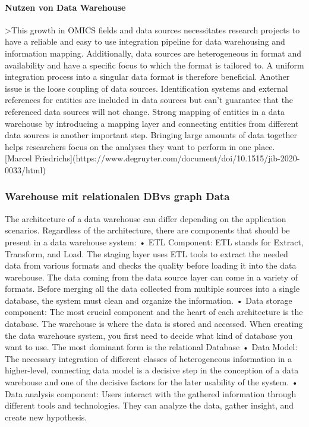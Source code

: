 \paragraph{Nutzen von Data Warehouse}
>This growth in OMICS fields and data sources necessitates research projects to have a reliable and easy to use integration pipeline for data warehousing and information mapping. Additionally, data sources are heterogeneous in format and availability and have a specific focus to which the format is tailored to. A uniform integration process into a singular data format is therefore beneficial. Another issue is the loose coupling of data sources. Identification systems and external references for entities are included in data sources but can’t guarantee that the referenced data sources will not change. Strong mapping of entities in a data warehouse by introducing a mapping layer and connecting entities from different data sources is another important step. Bringing large amounts of data together helps researchers focus on the analyses they want to perform in one place. [Marcel Friedrichs](https://www.degruyter.com/document/doi/10.1515/jib-2020-0033/html)

\subsubsection{Warehouse mit relationalen DBvs graph Data}

The architecture of a data warehouse can differ depending on the application scenarios. Regardless of the architecture, there are components that should be present in a data warehouse system:
•	ETL Component: ETL stands for Extract, Transform, and Load. The staging layer uses ETL tools to extract the needed data from various formats and checks the quality before loading it into the data warehouse. The data coming from the data source layer can come in a variety of formats. Before merging all the data collected from multiple sources into a single database, the system must clean and organize the information.
•	Data storage component: The most crucial component and the heart of each architecture is the database. The warehouse is where the data is stored and accessed. When creating the data warehouse system, you first need to decide what kind of database you want to use. The most dominant form is the relational Database
•	Data Model: The necessary integration of different classes of heterogeneous information in a higher-level, connecting data model is a decisive step in the conception of a data warehouse and one of the decisive factors for the later usability of the system.
•	Data analysis component: Users interact with the gathered information through different tools and technologies. They can analyze the data, gather insight, and create new hypothesis.

